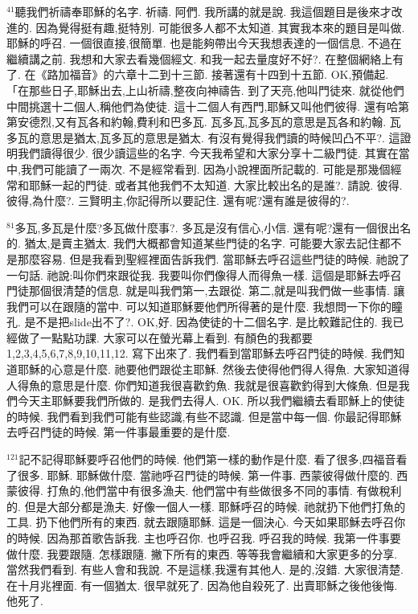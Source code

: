 \documentclass{book}
\begin{document}
$^{41}$聽我們祈禱奉耶穌的名字.
祈禱.
阿們.
我所講的就是說.
我這個題目是後來才改進的.
因為覺得挺有趣,挺特別.
可能很多人都不太知道.
其實我本來的題目是叫做.
耶穌的呼召.
一個很直接,很簡單.
也是能夠帶出今天我想表達的一個信息.
不過在繼續講之前.
我想和大家去看幾個經文.
和我一起去量度好不好?.
在整個網絡上有了.
在《路加福音》的六章十二到十三節.
接著還有十四到十五節.
OK,預備起.
「在那些日子,耶穌出去,上山祈禱,整夜向神禱告.
到了天亮,他叫門徒來.
就從他們中間挑選十二個人,稱他們為使徒.
這十二個人有西門,耶穌又叫他們彼得.
還有哈第第安德烈,又有瓦各和約翰,費利和巴多瓦.
瓦多瓦,瓦多瓦的意思是瓦各和約翰.
瓦多瓦的意思是猶太,瓦多瓦的意思是猶太.
有沒有覺得我們讀的時候凹凸不平?.
這證明我們讀得很少.
很少讀這些的名字.
今天我希望和大家分享十二級門徒.
其實在當中,我們可能讀了一兩次.
不是經常看到.
因為小說裡面所記載的.
可能是那幾個經常和耶穌一起的門徒.
或者其他我們不太知道.
大家比較出名的是誰?.
請說.
彼得.
彼得,為什麼?.
三賢明主,你記得所以要記住.
還有呢?還有誰是彼得的?.

$^{81}$多瓦,多瓦是什麼?多瓦做什麼事?.
多瓦是沒有信心,小信.
還有呢?還有一個很出名的.
猶太,是賣主猶太.
我們大概都會知道某些門徒的名字.
可能要大家去記住都不是那麼容易.
但是我看到聖經裡面告訴我們.
當耶穌去呼召這些門徒的時候.
祂說了一句話.
祂說:叫你們來跟從我.
我要叫你們像得人而得魚一樣.
這個是耶穌去呼召門徒那個很清楚的信息.
就是叫我們第一,去跟從.
第二,就是叫我們做一些事情.
讓我們可以在跟隨的當中.
可以知道耶穌要他們所得著的是什麼.
我想問一下你的瞳孔.
是不是把slide出不了?.
OK,好.
因為使徒的十二個名字.
是比較難記住的.
我已經做了一點點功課.
大家可以在螢光幕上看到.
有顏色的我都要1,2,3,4,5,6,7,8,9,10,11,12.
寫下出來了.
我們看到當耶穌去呼召門徒的時候.
我們知道耶穌的心意是什麼.
祂要他們跟從主耶穌.
然後去使得他們得人得魚.
大家知道得人得魚的意思是什麼.
你們知道我很喜歡釣魚.
我就是很喜歡釣得到大條魚.
但是我們今天主耶穌要我們所做的.
是我們去得人.
OK.
所以我們繼續去看耶穌上的使徒的時候.
我們看到我們可能有些認識,有些不認識.
但是當中每一個.
你最記得耶穌去呼召門徒的時候.
第一件事最重要的是什麼.

$^{121}$記不記得耶穌要呼召他們的時候.
他們第一樣的動作是什麼.
看了很多,四福音看了很多.
耶穌.
耶穌做什麼.
當祂呼召門徒的時候.
第一件事.
西蒙彼得做什麼的.
西蒙彼得.
打魚的,他們當中有很多漁夫.
他們當中有些做很多不同的事情.
有做稅利的.
但是大部分都是漁夫.
好像一個人一樣.
耶穌呼召的時候.
祂就扔下他們打魚的工具.
扔下他們所有的東西.
就去跟隨耶穌.
這是一個決心.
今天如果耶穌去呼召你的時候.
因為那首歌告訴我.
主也呼召你.
也呼召我.
呼召我的時候.
我第一件事要做什麼.
我要跟隨.
怎樣跟隨.
撇下所有的東西.
等等我會繼續和大家更多的分享.
當然我們看到.
有些人會和我說.
不是這樣,我還有其他人.
是的,沒錯.
大家很清楚.
在十月兆裡面.
有一個猶太.
很早就死了.
因為他自殺死了.
出賣耶穌之後他後悔.
他死了.
\end{document}
